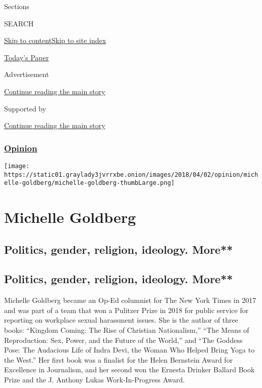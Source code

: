 Sections

SEARCH

\protect\hyperlink{site-content}{Skip to
content}\protect\hyperlink{site-index}{Skip to site index}

\href{https://myaccount.nytimes3xbfgragh.onion/auth/login?response_type=cookie\&client_id=vi}{}

\href{https://www.nytimes3xbfgragh.onion/section/todayspaper}{Today's
Paper}

Advertisement

\protect\hyperlink{after-top}{Continue reading the main story}

Supported by

\protect\hyperlink{after-sponsor}{Continue reading the main story}

\hypertarget{opinion}{%
\subsubsection{\texorpdfstring{\href{/section/opinion}{Opinion}}{Opinion}}\label{opinion}}

\texttt{[image: https://static01.graylady3jvrrxbe.onion/images/2018/04/02/opinion/michelle-goldberg/michelle-goldberg-thumbLarge.png]}

\hypertarget{michelle-goldberg}{%
\section{Michelle Goldberg}\label{michelle-goldberg}}

\hypertarget{politics-gender-religion-ideology-more}{%
\subsection{Politics, gender, religion, ideology.
More**}\label{politics-gender-religion-ideology-more}}

\hypertarget{politics-gender-religion-ideology-more-1}{%
\subsection{Politics, gender, religion, ideology.
More**}\label{politics-gender-religion-ideology-more-1}}

Michelle Goldberg became an Op-Ed columnist for The New York Times in
2017 and was part of a team that won a Pulitzer Prize in 2018 for public
service for reporting on workplace sexual harassment issues. She is the
author of three books: ``Kingdom Coming: The Rise of Christian
Nationalism,'' ``The Means of Reproduction: Sex, Power, and the Future
of the World,'' and ``The Goddess Pose: The Audacious Life of Indra
Devi, the Woman Who Helped Bring Yoga to the West.'' Her first book was
a finalist for the Helen Bernstein Award for Excellence in Journalism,
and her second won the Ernesta Drinker Ballard Book Prize and the J.
Anthony Lukas Work-In-Progress Award.


